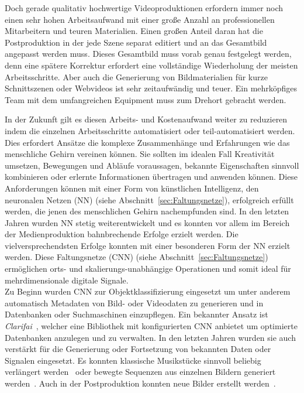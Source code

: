 \documentclass[times, 12pt,twocolumn]{article}
\begin{document}
Doch gerade qualitativ hochwertige Videoproduktionen erfordern immer noch einen sehr hohen Arbeitsaufwand mit einer große Anzahl an professionellen Mitarbeitern und teuren Materialien. Einen großen Anteil daran hat die Postproduktion in der jede Szene separat editiert und an das Gesamtbild angepasst werden muss. Dieses Gesamtbild muss vorab genau festgelegt werden, denn eine spätere Korrektur erfordert eine vollständige Wiederholung der meisten Arbeitsschritte. Aber auch die Generierung von Bildmaterialien für kurze Schnittszenen oder Webvideos ist sehr zeitaufwändig und teuer. Ein mehrköpfiges Team mit dem umfangreichen Equipment muss zum Drehort gebracht werden. 

In der Zukunft gilt es diesen Arbeits- und Kostenaufwand weiter zu reduzieren indem die einzelnen Arbeitsschritte automatisiert oder teil-automatisiert werden. Dies erfordert Ansätze die komplexe Zusammenhänge und Erfahrungen wie das menschliche Gehirn vereinen können. Sie sollten im idealen Fall Kreativität umsetzen, Bewegungen und Abläufe voraussagen, bekannte Eigenschaften sinnvoll kombinieren oder erlernte Informationen übertragen und anwenden können. Diese Anforderungen können mit einer Form von künstlichen Intelligenz, den neuronalen Netzen (NN) (siehe Abschnitt~\ref{sec:Faltungsnetze}), erfolgreich erfüllt werden, die jenen des menschlichen Gehirn nachempfunden sind. In den letzten Jahren wurden NN stetig weiterentwickelt und es konnten vor allem im Bereich der Medienproduktion bahnbrechende Erfolge erzielt werden. Die vielversprechendsten Erfolge konnten mit einer besonderen Form der NN erzielt werden. Diese Faltungsnetze (CNN) (siehe Abschnitt~\ref{sec:Faltungsnetze}) ermöglichen orts- und skalierungs-unabhängige Operationen und somit ideal für mehrdimensionale digitale Signale.\\

Zu Beginn wurden CNN zur Objektklassifizierung eingesetzt um unter anderem automatisch Metadaten von Bild- oder Videodaten zu generieren und in Datenbanken oder Suchmaschinen einzupflegen. Ein bekannter Ansatz ist \textit{Clarifai}~\cite{MITReview}, welcher eine Bibliothek mit konfigurierten CNN anbietet um optimierte Datenbanken anzulegen und zu verwalten. In den letzten Jahren wurden sie auch verstärkt für die Generierung oder Fortsetzung von bekannten Daten oder Signalen eingesetzt. Es konnten klassische Musikstücke sinnvoll beliebig verlängert werden~\cite{OordDZSVGKSK16} oder bewegte Sequenzen aus einzelnen Bildern generiert werden~\cite{VondrickPT16}. Auch in der Postproduktion konnten neue Bilder erstellt werden~\cite{DeepDream}. \\
\end{document}
